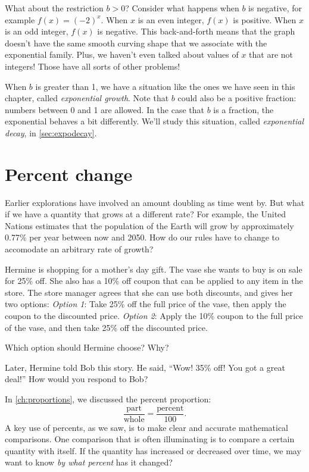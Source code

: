 What about the restriction $b>0$? Consider what happens when $b$ is negative, for example $f(x)=(-2)^x$. When $x$ is an even integer, $f(x)$ is positive. When $x$ is an odd integer, $f(x)$ is negative. This back-and-forth means that the graph doesn't have the same smooth curving shape that we associate with the exponential family. Plus, we haven't even talked about values of $x$ that are not integers! Those have all sorts of other problems!

When $b$ is greater than 1, we have a situation like the ones we have seen in this chapter, called \textit{exponential growth}. Note that $b$ could also be a positive fraction: numbers between 0 and 1 are allowed. In the case that $b$ is a fraction, the exponential behaves a bit differently. We'll study this situation, called \textit{exponential decay}, in \cref{sec:expodecay}.


\section{Percent change}
\label{sec:expopercentchange}

Earlier explorations have involved an amount doubling as time went by. But what if we have a quantity that grows at a different rate? For example, the United Nations estimates that the population of the Earth will grow by approximately 0.77\% per year between now and 2050. How do our rules have to change to accomodate an arbitrary rate of growth?

\begin{boxedexplore}
Hermine is shopping for a mother's day gift. The vase she wants to buy is on sale for 25\% off. She also has a 10\% off coupon that can be applied to any item in the store. The store manager agrees that she can use both discounts, and gives her two options: \textit{Option 1}: Take 25\% off the full price of the vase, then apply the coupon to the discounted price. \textit{Option 2}: Apply the 10\% coupon to the full price of the vase, and then take 25\% off the discounted price.

Which option should Hermine choose? Why?

Later, Hermine told Bob this story. He said, ``Wow! 35\% off! You got a great deal!'' How would you respond to Bob?
\end{boxedexplore}

In \cref{ch:proportions}, we discussed the percent proportion:
\[\frac{\text{part}}{\text{whole}} = \frac{\text{percent}}{100}.\]
A key use of percents, as we saw, is to make clear and accurate mathematical comparisons. One comparison that is often illuminating is to compare a certain quantity with itself. If the quantity has increased or decreased over time, we may want to know \textit{by what percent} has it changed?

